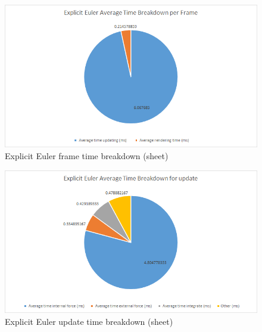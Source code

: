     \begin{figure}
    \begin{center}
      \includegraphics[scale=.9]{Figures/sheet_ee_ft}
    \end{center}
    \caption{Explicit Euler frame time breakdown (sheet)}
    \label{fig:ee ft sheet}
  \end{figure}
  
    \begin{figure}
    \begin{center}
      \includegraphics[scale=.9]{Figures/sheet_ee_ut}
    \end{center}
    \caption{Explicit Euler update time breakdown (sheet)}
    \label{fig:ee ut sheet}
  \end{figure}

